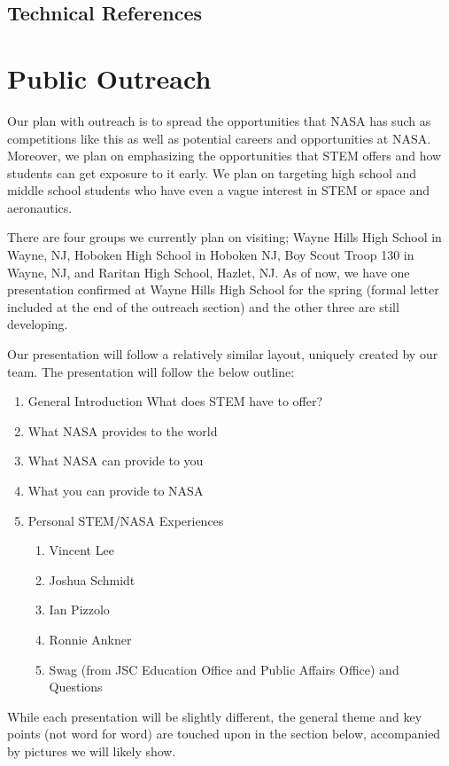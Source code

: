 \documentclass{article}
\let\Oldsection\section
\renewcommand{\section}{\FloatBarrier\Oldsection}
\let\Oldsubsection\subsection
\renewcommand{\subsection}{\FloatBarrier\Oldsubsection}
\begin{document}
\subsection{Technical References}

\printbibliography

\section{Public Outreach}

Our plan with outreach is to spread the opportunities that NASA has such as competitions like this as well as potential careers and opportunities at NASA. Moreover, we plan on emphasizing the opportunities that STEM offers and how students can get exposure to it early. We plan on targeting high school and middle school students who have even a vague interest in STEM or space and aeronautics.

There are four groups we currently plan on visiting; Wayne Hills High School in Wayne, NJ, Hoboken High School in Hoboken NJ, Boy Scout Troop 130 in Wayne, NJ, and Raritan High School, Hazlet, NJ. As of now, we have one presentation confirmed at Wayne Hills High School for the spring (formal letter included at the end of the outreach section) and the other three are still developing.

Our presentation will follow a relatively similar layout, uniquely created by our team. The presentation will follow the below outline:

\begin{enumerate}
\item General Introduction What does STEM have to offer?
\item What NASA provides to the world
\item What NASA can provide to you
\item What you can provide to NASA
\item Personal STEM/NASA Experiences
\begin{enumerate}
\item Vincent Lee
\item Joshua Schmidt
\item Ian Pizzolo
\item Ronnie Ankner
\item Swag (from JSC Education Office and Public Affairs Office) and Questions
\end{enumerate}
\end{enumerate}

While each presentation will be slightly different, the general theme and key points (not word for word) are touched upon in the section below, accompanied by pictures we will likely show.
\end{document}
